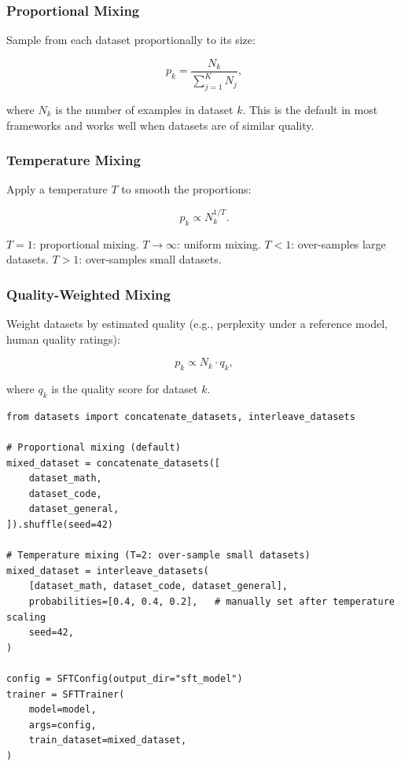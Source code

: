 \subsubsection*{Proportional Mixing}
\label{proportional-mixing}

Sample from each dataset proportionally to its size:

\[
p_k = \frac{N_k}{\sum_{j=1}^K N_j},
\]

where $N_k$ is the number of examples in dataset $k$. This is the default in most frameworks and works well when datasets are of similar quality.

\subsubsection*{Temperature Mixing}
\label{temperature-mixing}

Apply a temperature $T$ to smooth the proportions:

\[
p_k \propto N_k^{1/T}.
\]

$T=1$: proportional mixing. $T \to \infty$: uniform mixing. $T < 1$: over-samples large datasets. $T > 1$: over-samples small datasets.

\subsubsection*{Quality-Weighted Mixing}
\label{quality-weighted-mixing}

Weight datasets by estimated quality (e.g., perplexity under a reference model, human quality ratings):

\[
p_k \propto N_k \cdot q_k,
\]

where $q_k$ is the quality score for dataset $k$.

\begin{examplebox}
\begin{lstlisting}[style=pythonstyle]
from datasets import concatenate_datasets, interleave_datasets

# Proportional mixing (default)
mixed_dataset = concatenate_datasets([
    dataset_math,
    dataset_code,
    dataset_general,
]).shuffle(seed=42)

# Temperature mixing (T=2: over-sample small datasets)
mixed_dataset = interleave_datasets(
    [dataset_math, dataset_code, dataset_general],
    probabilities=[0.4, 0.4, 0.2],   # manually set after temperature scaling
    seed=42,
)

config = SFTConfig(output_dir="sft_model")
trainer = SFTTrainer(
    model=model,
    args=config,
    train_dataset=mixed_dataset,
)
\end{lstlisting}
\end{examplebox}

